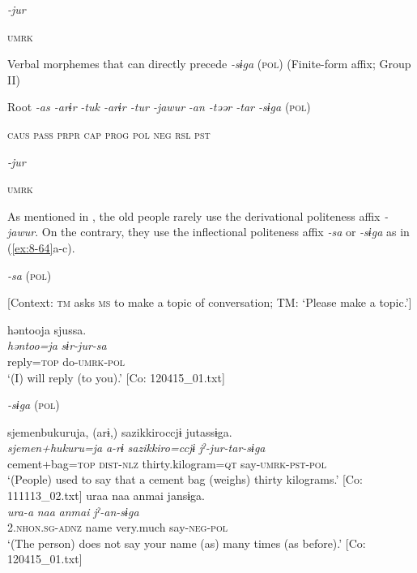           \textit{-jur}

          \textsc{umrk}


\ex Verbal morphemes that can directly precede \textit{-sɨga} (\textsc{pol}) (Finite-form affix; Group II)

  Root  \textit{-as  -arɨr} %
\textit{-tuk  -arɨr  -tur  -jawur} %
\textit{-an  -təər  -tar  -sɨga} (\textsc{pol})

    \textsc{caus}  \textsc{pass}  \textsc{prpr}  \textsc{cap}  \textsc{prog}  \textsc{pol}  \textsc{neg}  \textsc{rsl}  \textsc{pst}

          \textit{-jur}

          \textsc{umrk}
\z
\z

As mentioned in , the old people rarely use the derivational politeness affix \textit{-jawur}. On the contrary, they use the inflectional politeness affix \textit{-sa} or \textit{-sɨga} as in (\ref{ex:8-64}a-c).

\ea\label{ex:8-64}
  \textit{-sa} (\textsc{pol})

\ea {}[Context: \textsc{tm} asks \textsc{ms} to make a topic of conversation; TM: ‘Please make a topic.’]

{\TM}
\glll  həntooja  sjussa.\\
\textit{həntoo=ja}  \textit{sɨr-jur-sa}\\
reply=\textsc{top}  do-\textsc{umrk}-\textsc{pol}\\
\glt ‘(I) will reply (to you).’ [Co: 120415\_01.txt]

  \textit{-sɨga} (\textsc{pol})

\ex
{\TM}
\glll  sjemenbukuruja,  (arɨ,)  sazikkiroccjɨ  jutassɨga.\\
\textit{sjemen+hukuru=ja}  \textit{a-rɨ}  \textit{sazikkiro=ccjɨ}  \textit{jˀ-jur-tar-sɨga}\\
cement+bag=\textsc{top}  \textsc{dist}-\textsc{nlz}  thirty.kilogram=\textsc{qt}  say-\textsc{umrk}-\textsc{pst}-\textsc{pol}\\
\glt ‘(People) used to say that a cement bag (weighs) thirty kilograms.’ [Co: 111113\_02.txt]
\ex
{\TM}
\glll  uraa  naa  anmai  jansɨga.\\
\textit{ura-a}  \textit{naa}  \textit{anmai}  \textit{jˀ-an-sɨga}\\
2.\textsc{nhon}.\textsc{sg}-\textsc{adnz}  name  very.much  say-\textsc{neg}-\textsc{pol}\\
\glt ‘(The person) does not say your name (as) many times (as before).’ [Co: 120415\_01.txt]
\z
\z

